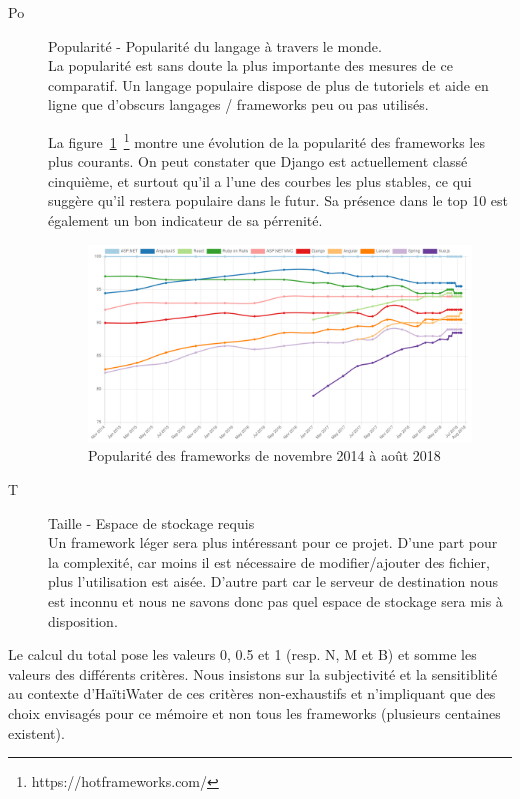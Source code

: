 \documentclass{EPL-master-thesis-covers-FR}
\begin{document}
\begin{description}
					\item[Po] Popularité - Popularité du langage à travers le monde. \hfill \\
							La popularité est sans doute la plus importante des mesures de ce comparatif. Un langage populaire dispose de plus de tutoriels et aide en ligne que d'obscurs langages / frameworks peu ou pas utilisés.

							La figure~\ref{fig:hotframework}~\footnote{https://hotframeworks.com/} montre une évolution de la popularité des frameworks les plus courants. On peut constater que Django est actuellement classé cinquième, et surtout qu'il a l'une des courbes les plus stables, ce qui suggère qu'il restera populaire dans le futur. Sa présence dans le top 10 est également un bon indicateur de sa pérrenité.

							\begin{figure}
								\centering
								\includegraphics[width=\textwidth]{images/hotframework.png}
								\caption{Popularité des frameworks de novembre 2014 à août 2018}
								\label{fig:hotframework}
							\end{figure}

					\item[T] Taille - Espace de stockage requis \hfill \\
							Un framework léger sera plus intéressant pour ce projet. D'une part pour la complexité, car moins il est nécessaire de modifier/ajouter des fichier, plus l'utilisation est aisée. D'autre part car le serveur de destination nous est inconnu et nous ne savons donc pas quel espace de stockage sera mis à disposition.
				\end{description}

				Le calcul du total pose les valeurs 0, 0.5 et 1 (resp. N, M et B) et somme les valeurs des différents critères. Nous insistons sur la subjectivité et la sensitiblité au contexte d'HaïtiWater de ces critères non-exhaustifs et n'impliquant que des choix envisagés pour ce mémoire et non tous les frameworks (plusieurs centaines existent).
\end{document}
